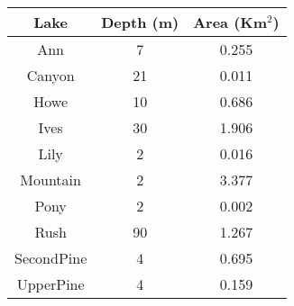 \begin{table}[ht]
\centering
\begin{tabular}{ccc}
  \hline
\hline
  Lake & Depth (m) & Area (Km$^2$) \\
 \hline
Ann &  7 & 0.255 \\ 
  Canyon & 21 & 0.011 \\ 
  Howe & 10 & 0.686 \\ 
  Ives & 30 & 1.906 \\ 
  Lily &  2 & 0.016 \\ 
  Mountain &  2 & 3.377 \\ 
  Pony &  2 & 0.002 \\ 
  Rush & 90 & 1.267 \\ 
  SecondPine &  4 & 0.695 \\ 
  UpperPine &  4 & 0.159 \\ 
   \hline
\end{tabular}
\end{table}
